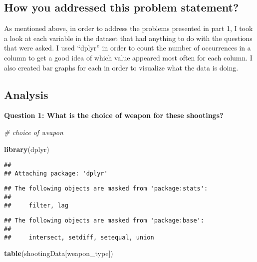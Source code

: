 \documentclass[
]{article}
\newenvironment{Shaded}{\begin{snugshade}}{\end{snugshade}}
\newcommand{\CommentTok}[1]{\textcolor[rgb]{0.56,0.35,0.01}{\textit{#1}}}
\newcommand{\FunctionTok}[1]{\textcolor[rgb]{0.13,0.29,0.53}{\textbf{#1}}}
\newcommand{\NormalTok}[1]{#1}
\newcommand{\StringTok}[1]{\textcolor[rgb]{0.31,0.60,0.02}{#1}}
\begin{document}
\subsection{How you addressed this problem
statement?}\label{how-you-addressed-this-problem-statement}

As mentioned above, in order to address the problems presented in part
1, I took a look at each variable in the dataset that had anything to do
with the questions that were asked. I used ``dplyr'' in order to count
the number of occurrences in a column to get a good idea of which value
appeared most often for each column. I also created bar graphs for each
in order to visualize what the data is doing.

\subsection{Analysis}\label{analysis}

\textbf{Question 1: What is the choice of weapon for these shootings?}

\begin{Shaded}
\begin{Highlighting}[]
\CommentTok{\# choice of weapon}

\FunctionTok{library}\NormalTok{(dplyr)}
\end{Highlighting}
\end{Shaded}

\begin{verbatim}
## 
## Attaching package: 'dplyr'
\end{verbatim}

\begin{verbatim}
## The following objects are masked from 'package:stats':
## 
##     filter, lag
\end{verbatim}

\begin{verbatim}
## The following objects are masked from 'package:base':
## 
##     intersect, setdiff, setequal, union
\end{verbatim}

\begin{Shaded}
\begin{Highlighting}[]
\FunctionTok{table}\NormalTok{(shootingData[}\StringTok{\textquotesingle{}weapon\_type\textquotesingle{}}\NormalTok{])}
\end{Highlighting}
\end{Shaded}
\end{document}
